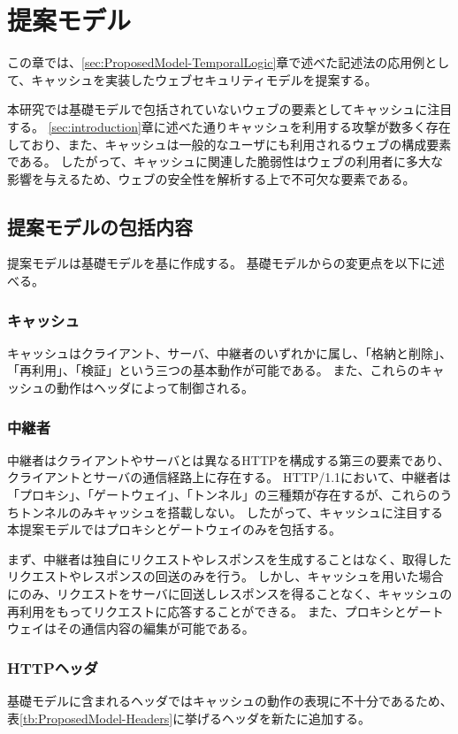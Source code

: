 \documentclass[journal]{IEEEtran}
\begin{document}
\section{提案モデル}
この章では、\ref{sec:ProposedModel-TemporalLogic}章で述べた記述法の応用例として、キャッシュを実装したウェブセキュリティモデルを提案する。

本研究では基礎モデルで包括されていないウェブの要素としてキャッシュに注目する。
\ref{sec:introduction}章に述べた通りキャッシュを利用する攻撃が数多く存在しており、また、キャッシュは一般的なユーザにも利用されるウェブの構成要素である。
したがって、キャッシュに関連した脆弱性はウェブの利用者に多大な影響を与えるため、ウェブの安全性を解析する上で不可欠な要素である。

\subsection{提案モデルの包括内容}
\label{sec:ProposedModel-Content}
提案モデルは基礎モデルを基に作成する。
基礎モデルからの変更点を以下に述べる。

\subsubsection{キャッシュ}
キャッシュはクライアント、サーバ、中継者のいずれかに属し、「格納と削除」、「再利用」、「検証」という三つの基本動作が可能である。
また、これらのキャッシュの動作はヘッダによって制御される。

\subsubsection{中継者}
中継者はクライアントやサーバとは異なるHTTPを構成する第三の要素であり、クライアントとサーバの通信経路上に存在する。
HTTP/1.1において、中継者は「プロキシ」、「ゲートウェイ」、「トンネル」の三種類が存在するが、これらのうちトンネルのみキャッシュを搭載しない。
したがって、キャッシュに注目する本提案モデルではプロキシとゲートウェイのみを包括する。

まず、中継者は独自にリクエストやレスポンスを生成することはなく、取得したリクエストやレスポンスの回送のみを行う。
しかし、キャッシュを用いた場合にのみ、リクエストをサーバに回送しレスポンスを得ることなく、キャッシュの再利用をもってリクエストに応答することができる。
また、プロキシとゲートウェイはその通信内容の編集が可能である。

\subsubsection{HTTPヘッダ}
基礎モデルに含まれるヘッダではキャッシュの動作の表現に不十分であるため、表\ref{tb:ProposedModel-Headers}に挙げるヘッダを新たに追加する。
\end{document}
